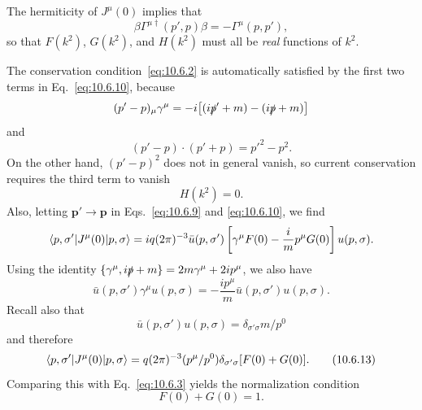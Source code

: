 The hermiticity of $J^\mu(0)$ implies that
\begin{equation}
  \beta\Gamma^{\mu\dagger}(p',p)\beta=-\Gamma^\mu(p,p'),
  \tag{10.6.11}\label{eq:10.6.11}
\end{equation}
so that $F(k^2)$, $G(k^2)$, and $H(k^2)$ must all be \emph{real} functions of
$k^2$.

The conservation condition~\eqref{eq:10.6.2} is automatically satisfied by
the first two terms in Eq.~\eqref{eq:10.6.10}, because
\begin{equation*}
  (p'-p)_\mu\gamma^\mu
  =-i\bigl[(i\sl{p}'+m)-(i\sl{p}+m)\bigr]
\end{equation*}
and
\begin{equation*}
  (p'-p)\cdot(p'+p)=p'^2-p^2.
\end{equation*}
On the other hand, $(p'-p)^2$ does not in general vanish, so current
conservation requires the third term to vanish
\begin{equation}
  H(k^2)=0.
  \tag{10.6.12}\label{eq:10.6.12}
\end{equation}
Also, letting $\mathbf{p}'\to\mathbf{p}$ in Eqs.~\eqref{eq:10.6.9} and
\eqref{eq:10.6.10}, we find
\begin{equation*}
  \bra{p,\sigma'}J^\mu(0)\ket{p,\sigma}
  =iq(2\pi)^{-3}\bar u(p,\sigma')
  \left[\gamma^\mu F(0)-\frac{i}{m}p^\mu G(0)\right]u(p,\sigma).
\end{equation*}
Using the identity $\{\gamma^\mu,i\sl{p}+m\}=2m\gamma^\mu+2ip^\mu$,
we also have
\begin{equation*}
  \bar u(p,\sigma')\gamma^\mu u(p,\sigma)
  =-\frac{ip^\mu}{m}\bar u(p,\sigma')u(p,\sigma).
\end{equation*}
Recall also that
\begin{equation*}
  \bar u(p,\sigma')u(p,\sigma)=\delta_{\sigma'\sigma}m/p^0
\end{equation*}
and therefore
\begin{equation}
  \bra{p,\sigma'}J^\mu(0)\ket{p,\sigma}
  =q(2\pi)^{-3}(p^\mu/p^0)\delta_{\sigma'\sigma}[F(0)+G(0)].
  \tag{10.6.13}\label{eq:10.6.13}
\end{equation}
Comparing this with Eq.~\eqref{eq:10.6.3} yields the normalization condition
\begin{equation}
  F(0)+G(0)=1.
  \tag{10.6.14}\label{eq:10.6.14}
\end{equation}

